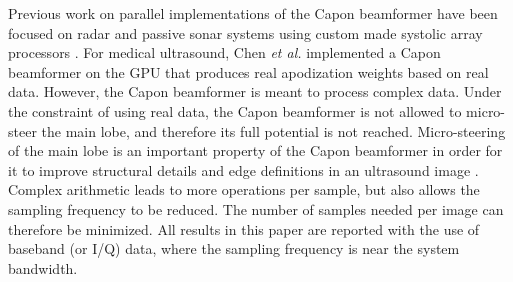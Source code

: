 Previous work on parallel implementations of the Capon beamformer have been focused on radar and passive sonar systems using custom made systolic array processors \cite{McWhirter1989, Moonen1993, Sinha2002}. For medical ultrasound, Chen \textit{et al.} \cite{Chen2011a, Chen2011, Chen} implemented a Capon beamformer on the GPU that produces real apodization weights based on real data. However, the Capon beamformer is meant to process complex data. Under the constraint of using real data, the Capon beamformer is not allowed to micro-steer the main lobe, and therefore its full potential is not reached. Micro-steering of the main lobe is an important property of the Capon beamformer in order for it to improve structural details and edge definitions in an ultrasound image \cite[Fig~9.]{Synnevag2009}. Complex arithmetic leads to more operations per sample, but also allows the sampling frequency to be reduced. The number of samples needed per image can therefore be minimized. All results in this paper are reported with the use of baseband (or I/Q) data, where the sampling frequency is near the system bandwidth. 


